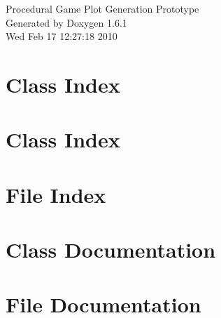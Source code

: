 \documentclass[a4paper]{book}
\begin{document}
\hypersetup{pageanchor=false}
\begin{titlepage}
\vspace*{7cm}
\begin{center}
{\Large Procedural Game Plot Generation Prototype }\\
\vspace*{1cm}
{\large Generated by Doxygen 1.6.1}\\
\vspace*{0.5cm}
{\small Wed Feb 17 12:27:18 2010}\\
\end{center}
\end{titlepage}
\clearemptydoublepage
{}
\tableofcontents
\clearemptydoublepage
{}
\hypersetup{pageanchor=true}
\chapter{Class Index}

\chapter{Class Index}

\chapter{File Index}

\chapter{Class Documentation}



















\chapter{File Documentation}




































\printindex
\end{document}
